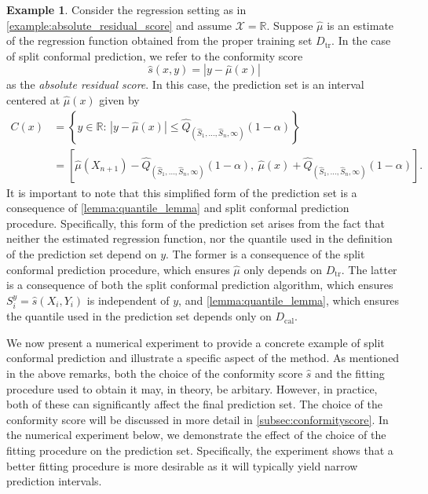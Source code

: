 \documentclass[11pt, titlepage]{article} %
\numberwithin{equation}{section}
\theoremstyle{definition}
\newtheorem{example}{Example}
\numberwithin{theorem}{section}
\numberwithin{lemma}{section}
\numberwithin{corollary}{section}
\numberwithin{proposition}{section}
\numberwithin{definition}{section}
\numberwithin{remark}{section}
\begin{document}
\begin{example}
Consider the regression setting as in \cref{example:absolute_residual_score} and assume \(\mathcal{X} = \mathbb{R}\). Suppose \(\hat{\mu}\) is an estimate of the regression function obtained from the proper training set \(D_\mathrm{tr}\). In the case of split conformal prediction, we refer to the conformity score \[\hat{s}(x,y) = |y - \hat{\mu}(x)|\] as the \textit{absolute residual score}. In this case, the prediction set is an interval centered at \(\hat{\mu}(x) \) given by \begin{align}
    C(x) &= \left\{y \in \mathbb{R}: \, |y - \hat{\mu}(x) | \leq \hat{Q}_{(\hat{S}_1, \ldots, \hat{S}_n, \infty)}(1-\alpha) \right\} \nonumber \\
    &= \left[ \hat{\mu}(X_{n+1}) - \hat{Q}_{(\hat{S}_1, \ldots, \hat{S}_n, \infty)}(1-\alpha), \ \hat{\mu}(x) + \hat{Q}_{(\hat{S}_1, \ldots, \hat{S}_n, \infty)}(1-\alpha) \right] \label{eqn:split_absolute_residual_prediction_set}.
\end{align}
\noindent
It is important to note that this simplified form of the prediction set is a consequence of \cref{lemma:quantile_lemma} and split conformal prediction procedure. Specifically, this form of the prediction set arises from the fact that neither the estimated regression function, nor the quantile used in the definition of the prediction set depend on \(y\). The former is a consequence of the split conformal prediction procedure, which ensures \(\hat{\mu}\) only depends on \(D_\mathrm{tr}\). The latter is a consequence of both the split conformal prediction algorithm, which ensures \(S_i^y = \hat{s}(X_i, Y_i)\) is independent of \(y\), and \cref{lemma:quantile_lemma}, which ensures the quantile used in the prediction set depends only on \(D_\mathrm{cal}\).
\label{example:splitCP_absolute_residual_score}
\end{example}

\noindent
We now present a numerical experiment to provide a concrete example of split conformal prediction and illustrate a specific aspect of the method. As mentioned in the above remarks, both the choice of the conformity score \(\hat{s}\) and the fitting procedure used to obtain it may, in theory, be arbitary. However, in practice, both of these can significantly affect the final prediction set. The choice of the conformity score will be discussed in more detail in \cref{subsec:conformityscore}. In the numerical experiment below, we demonstrate the effect of the choice of the fitting procedure on the prediction set. Specifically, the experiment shows that a better fitting procedure is more desirable as it will typically yield narrow prediction intervals.\vskip5pt
\end{document}
